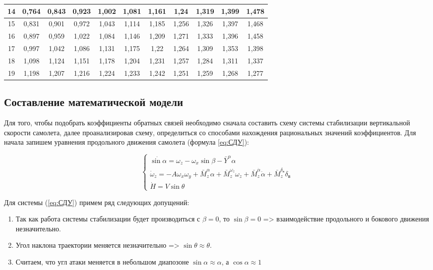 \begin{longtable}[H]{|c|c|c|c|c|c|c|c|c|c|c|}
        14 & 0,764 & 0,843 & 0,923 & 1,002 & 1,081 & 1,161 & 1,24 & 1,319 & 1,399 & 1,478  \\ \hline
        15 & 0,831 & 0,901 & 0,972 & 1,043 & 1,114 & 1,185 & 1,256 & 1,326 & 1,397 & 1,468  \\ \hline
        16 & 0,897 & 0,959 & 1,022 & 1,084 & 1,146 & 1,209 & 1,271 & 1,333 & 1,396 & 1,458  \\ \hline
        17 & 0,997 & 1,042 & 1,086 & 1,131 & 1,175 & 1,22 & 1,264 & 1,309 & 1,353 & 1,398  \\ \hline
        18 & 1,098 & 1,124 & 1,151 & 1,178 & 1,204 & 1,231 & 1,257 & 1,284 & 1,311 & 1,337  \\ \hline
        19  & 1,198 & 1,207 & 1,216 & 1,224 & 1,233 & 1,242 & 1,251 & 1,259 & 1,268 & 1,277 \\ \hline
    \end{longtable}

\subsection{Составление математической модели}

Для того, чтобы подобрать коэффициенты обратных связей необходимо сначала составить схему системы стабилизации вертикальной скорости самолета, далее проанализировав схему, определиться со способами нахождения рациональных значений коэффициентов. Для начала запишем уравнения продольного движения самолета (формула \ref{eq:СДУ}):

\begin{equation}
    \label{eq:СДУ}
    \begin{cases}
        \dot{\sin{\alpha}}=\omega_z-\omega_x \sin{\beta}-\bar{Y}^{\alpha} \alpha \\
        \dot{\omega}_z=-A \omega_x \omega_y+\bar{M}_z^{\alpha} \alpha+\bar{M}_z^{\omega_z} \omega_z +\bar{M}_z^{\dot{\alpha}} \dot{\alpha}+\bar{M}_z^{\delta_{\text{в}}} \delta_{\text{в}} \\
        \dot{H}=V\sin{\theta}
    \end{cases}
\end{equation}

Для системы (\ref{eq:СДУ}) примем ряд следующих допущений:
\begin{enumerate}
    \item Так как работа системы стабилизации будет производиться с $\beta=0$, то $\sin{\beta}=0$ => взаимодействие продольного и бокового движения незначительно.
    \item Угол наклона траектории меняется незначительно => $\sin{\theta} \approx \theta$.
    \item Считаем, что угл атаки меняется в небольшом диапозоне $\sin{\alpha} \approx \alpha$, а $\cos{\alpha} \approx 1$
\end{enumerate}

